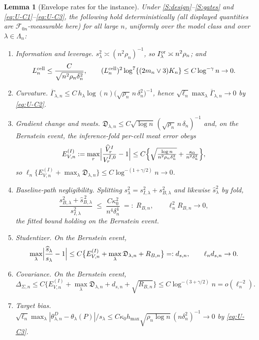 \documentclass[11pt]{article}
\newtheorem{lemma}[theorem]{Lemma}
\theoremstyle{definition}
\newcommand{\1}{\mathbf 1}\newcommand{\op}{\operatorname}
\begin{document}
\begin{lemma}[Envelope rates for the instance]\label{lem:U-rates}
Under \ref{S:design}--\ref{S:gates} and \eqref{eq:U-C1}--\eqref{eq:U-C3}, the
following hold deterministically (all displayed quantities are
$\mathcal F_{0n}$-measurable here) for all large $n$, uniformly over the model
class and over $\lambda\in\Lambda_n$:
\begin{enumerate}[label=\textup{(\roman*)},leftmargin=2.4em,itemsep=2pt]
\item\emph{Information and leverage.}
$s_\lambda^2\asymp(n^2\rho_n)^{-1}$, so
$I_\lambda^{\rm or}\asymp n^2\rho_n$; and
\[
L_n^{\rm cell}\le\frac{C}{\sqrt{n^2\rho_n\delta_n^2}},
\qquad
(L_n^{\rm cell})^2\log^7\{(2m_n\vee3)K_n\}
\le C\log^{-\gamma}n\to0 .
\]
\item\emph{Curvature.}
$\overline\Gamma_{\lambda,n}\le
C\,h_\lambda\log(n)\bigl(\sqrt{\rho_n}\,n\,\delta_n^{2}\bigr)^{-1}$, hence
$\sqrt{\ell_n}\max_\lambda\overline\Gamma_{\lambda,n}\to0$ by \eqref{eq:U-C2}.
\item\emph{Gradient change and meats.}
$\mathfrak D_{\lambda,n}\le C\sqrt{\log n}\,(\sqrt{\rho_n}\,n\,\delta_n)^{-1}$
and, on the Bernstein event, the inference-fold per-cell meat error obeys
\[
E_{V,n}^{(I)}
:=\max_{r}\Bigl|\frac{\widehat V^I_r}{V^{I,0}_r}-1\Bigr|
\le C\Bigl\{\sqrt{\tfrac{\log n}{n^2\rho_n\delta_n^2}}
+\tfrac{\kappa_0}{n^2\delta_n^2}\Bigr\},
\]
so $\ell_n\{E_{V,n}^{(I)}+\max_\lambda\mathfrak D_{\lambda,n}\}\le
C\log^{-(1+\gamma/2)}n\to0$.
\item\emph{Baseline-path negligibility.}  Splitting
$s_\lambda^2=s_{I,\lambda}^2+s_{B,\lambda}^2$ and likewise
$\widehat s_\lambda^2$ by fold,
\[
\frac{s_{B,\lambda}^2+\widehat s_{B,\lambda}^{\,2}}{s_{I,\lambda}^2}
\;\le\;
\frac{C\kappa_0^2}{n^4\delta_n^4}\;=:\;R_{B,n},
\qquad
\ell_n^2R_{B,n}\to0,
\]
the fitted bound holding on the Bernstein event.
\item\emph{Studentizer.}  On the Bernstein event,
\[
\max_{\lambda}\Bigl|\frac{\widehat s_\lambda}{s_\lambda}-1\Bigr|
\le C\bigl\{E_{V,n}^{(I)}
+\max_\lambda\mathfrak D_{\lambda,n}+R_{B,n}\bigr\}
=:d_{s,n},
\qquad
\ell_nd_{s,n}\to0 .
\]
\item\emph{Covariance.}  On the Bernstein event,
\[
\Delta_{\Sigma,n}
\le C\bigl\{E_{V,n}^{(I)}
+\max_\lambda\mathfrak D_{\lambda,n}
+d_{s,n}+\sqrt{R_{B,n}}\bigr\}
\le C\log^{-(3+\gamma/2)}n
=o(\ell_n^{-2}).
\]
\item\emph{Target bias.}
$\sqrt{\ell_n}\max_\lambda|\theta^D_{\lambda,n}-\theta_\lambda(P)|/s_\lambda
\le C\kappa_0h_{\max}\sqrt{\rho_n\log n}\,(n\delta_n^2)^{-1}\to0$ by
\eqref{eq:U-C3}.
\end{enumerate}
\end{lemma}
\end{document}
